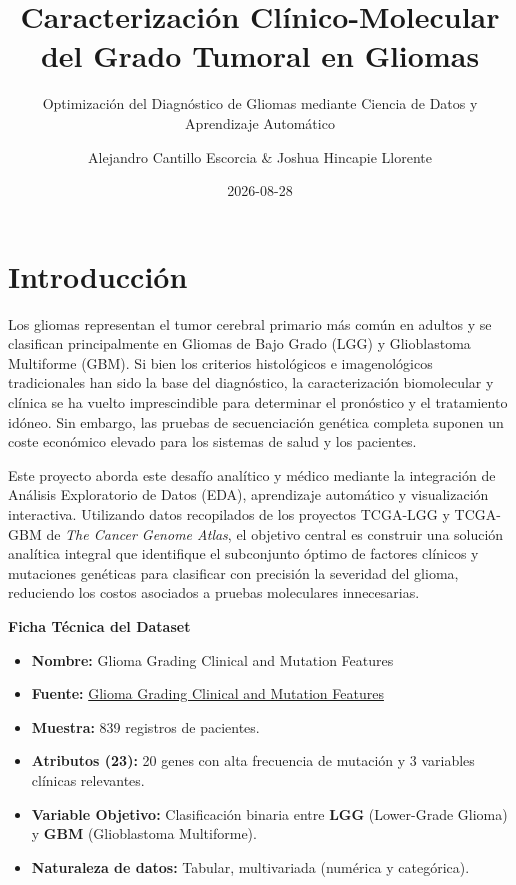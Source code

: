 \documentclass[
]{book}
\title{Caracterización Clínico-Molecular del Grado Tumoral en Gliomas}
\subtitle{Optimización del Diagnóstico de Gliomas mediante Ciencia de Datos y Aprendizaje Automático}
\author{Alejandro Cantillo Escorcia \& Joshua Hincapie Llorente}
\date{2026-08-28}
\providecommand{\tightlist}{%
  \setlength{\itemsep}{0pt}\setlength{\parskip}{0pt}}
\begin{document}
\maketitle

{
\setcounter{tocdepth}{1}
\tableofcontents
}
\chapter{Introducción}\label{introducciuxf3n}

Los gliomas representan el tumor cerebral primario más común en adultos y se clasifican principalmente en Gliomas de Bajo Grado (LGG) y Glioblastoma Multiforme (GBM). Si bien los criterios histológicos e imagenológicos tradicionales han sido la base del diagnóstico, la caracterización biomolecular y clínica se ha vuelto imprescindible para determinar el pronóstico y el tratamiento idóneo. Sin embargo, las pruebas de secuenciación genética completa suponen un coste económico elevado para los sistemas de salud y los pacientes.

Este proyecto aborda este desafío analítico y médico mediante la integración de Análisis Exploratorio de Datos (EDA), aprendizaje automático y visualización interactiva. Utilizando datos recopilados de los proyectos TCGA-LGG y TCGA-GBM de \emph{The Cancer Genome Atlas}, el objetivo central es construir una solución analítica integral que identifique el subconjunto óptimo de factores clínicos y mutaciones genéticas para clasificar con precisión la severidad del glioma, reduciendo los costos asociados a pruebas moleculares innecesarias.

\textbf{Ficha Técnica del Dataset}

\begin{itemize}
\tightlist
\item
  \textbf{Nombre:} Glioma Grading Clinical and Mutation Features
\item
  \textbf{Fuente:} \href{https://archive.ics.uci.edu/dataset/759/glioma+grading+clinical+and+mutation+features+dataset}{Glioma Grading Clinical and Mutation Features}
\item
  \textbf{Muestra:} 839 registros de pacientes.
\item
  \textbf{Atributos (23):} 20 genes con alta frecuencia de mutación y 3 variables clínicas relevantes.
\item
  \textbf{Variable Objetivo:} Clasificación binaria entre \textbf{LGG} (Lower-Grade Glioma) y \textbf{GBM} (Glioblastoma Multiforme).
\item
  \textbf{Naturaleza de datos:} Tabular, multivariada (numérica y categórica).
\end{itemize}
\end{document}
